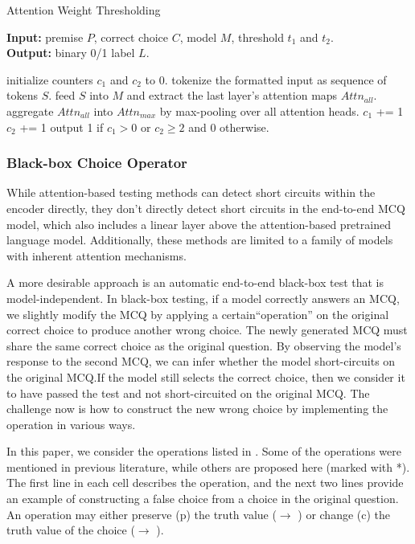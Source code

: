 \begin{algorithm}
\small
	\caption{Attention Weight Thresholding}
	\label{AW}
\hspace*{0.02in} {\bf Input:} 
premise $P$, correct choice $C$, model $M$,  threshold $t_1$ and $t_2$. \\
\hspace*{0.02in} {\bf Output:}
binary 0/1 label $L$.
	\begin{algorithmic}[1]
		\State initialize counters $c_1$ and $c_2$ to 0.
		\State tokenize the formatted input as sequence of tokens $S$.
		\State feed $S$ into $M$ and extract the last layer's attention maps $Attn_{all}$.
		\State aggregate $Attn_{all}$ into $Attn_{max}$ by max-pooling over all attention heads.
				$c_1$ += 1
		\EndIf
				$c_2$ += 1
		\EndIf
		\EndFor
		\EndFor
		\State output 1 if $c_1>0$ or $c_2\geq 2$ and 0 otherwise.
	\end{algorithmic}
\end{algorithm}

\subsubsection*{Black-box Choice Operator}
\label{sec:proxy}
While attention-based testing methods can detect short circuits within the encoder directly, they don't directly detect short circuits in the end-to-end MCQ model, which also includes a linear layer above the attention-based pretrained language model. Additionally, these methods are limited to a family of models with inherent attention mechanisms.

A more desirable approach is an automatic end-to-end black-box test that is model-independent. In black-box testing, if a model correctly answers an MCQ, we slightly modify the MCQ by applying a certain``operation'' on the original correct choice to produce another wrong choice. The newly generated MCQ must share the same correct choice as the original question. By observing the model's response to the second MCQ, we can infer whether the model short-circuits on the original MCQ.If the model still selects the correct choice, then we consider it to have passed the test and not short-circuited on the original MCQ. The challenge now is how to construct the new wrong choice by implementing the operation in various ways.

In this paper, we consider the operations listed in . Some of the operations were mentioned in previous literature, while others are proposed here (marked with *).
The first line in each cell describes the operation, and the next two lines provide an example of constructing a false choice from a choice in the original question. An operation may either preserve (p) the truth value (\crosssymbol $\rightarrow$ \crosssymbol) or change (c) the truth value of the choice (\checksymbol $\rightarrow$ \crosssymbol).


